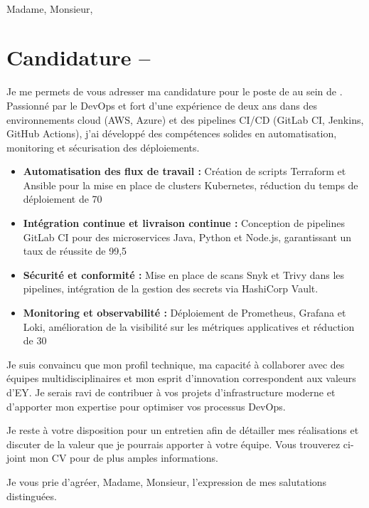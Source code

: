 \begin{letter}{\CompanyName \\ \CompanyAddress}

\opening{Madame, Monsieur,}

\section*{Candidature – \textbf{\Position}}

Je me permets de vous adresser ma candidature pour le poste de \textbf{\Position} au sein de \CompanyName. Passionné par le DevOps et fort d’une expérience de deux ans dans des environnements cloud (AWS, Azure) et des pipelines CI/CD (GitLab CI, Jenkins, GitHub Actions), j’ai développé des compétences solides en automatisation, monitoring et sécurisation des déploiements.

\begin{itemize}
  \item \textbf{Automatisation des flux de travail :} Création de scripts Terraform et Ansible pour la mise en place de clusters Kubernetes, réduction du temps de déploiement de 70 %
  \item \textbf{Intégration continue et livraison continue :} Conception de pipelines GitLab CI pour des microservices Java, Python et Node.js, garantissant un taux de réussite de 99,5 %
  \item \textbf{Sécurité et conformité :} Mise en place de scans Snyk et Trivy dans les pipelines, intégration de la gestion des secrets via HashiCorp Vault.
  \item \textbf{Monitoring et observabilité :} Déploiement de Prometheus, Grafana et Loki, amélioration de la visibilité sur les métriques applicatives et réduction de 30 %
\end{itemize}

Je suis convaincu que mon profil technique, ma capacité à collaborer avec des équipes multidisciplinaires et mon esprit d’innovation correspondent aux valeurs d’EY. Je serais ravi de contribuer à vos projets d’infrastructure moderne et d’apporter mon expertise pour optimiser vos processus DevOps.

Je reste à votre disposition pour un entretien afin de détailler mes réalisations et discuter de la valeur que je pourrais apporter à votre équipe. Vous trouverez ci-joint mon CV pour de plus amples informations.

Je vous prie d’agréer, Madame, Monsieur, l’expression de mes salutations distinguées.

\vspace{2em}
\begin{flushright}
\textbf{\CandidateName}\\
\CandidateAddress\\
\CandidatePhone \hspace{2em} \CandidateEmail
\end{flushright}

\end{letter}